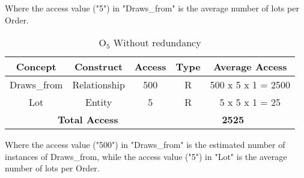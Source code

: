 Where the access value ("5") in "Draws\_from" is the average number of lots per Order.

\begin{table}[!h]\caption{	$ \textrm{O}_\textrm{5} $ Without redundancy }
	\begin{center}
		\begin{tabular}{| c | c | c | c | c |}
			\hline
			\textbf{Concept} & \textbf{Construct} & \textbf{Access} & \textbf{Type} & \textbf{Average Access} \\ \hline
			Draws\_from & Relationship & 500 & R & 500 x 5 x 1 = 2500 \\ \hline
			Lot & Entity &  5 & R & 5 x 5 x 1 = 25 \\ \hline
			\multicolumn{3}{|c|}{\textbf{Total Access}} & \multicolumn{2}{|c|}{\textbf{2525}} \\ \hline
		\end{tabular}
	\end{center}
\end{table}

Where the access value ("500") in "Draws\_from" is the estimated number of instances of Draws\_from, while the access value ("5") in "Lot" is the average number of lots per Order.

